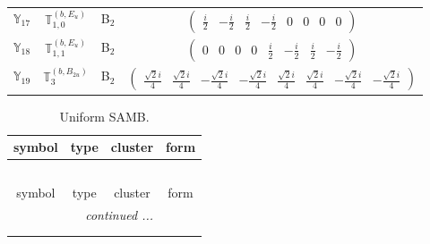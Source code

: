 \documentclass[fleqn,10pt,landscape]{article}
\begin{document}
\begin{itemize}
\begin{center}
\begin{longtable}{c|c|c|c}
$ \mathbb{Y}_{17} $ & $\mathbb{T}_{1,0}^{(b,E_{u})}$ & B$_{2}$ & $\begin{pmatrix} \frac{i}{2} & - \frac{i}{2} & \frac{i}{2} & - \frac{i}{2} & 0 & 0 & 0 & 0 \end{pmatrix}$ \\
$ \mathbb{Y}_{18} $ & $\mathbb{T}_{1,1}^{(b,E_{u})}$ & B$_{2}$ & $\begin{pmatrix} 0 & 0 & 0 & 0 & \frac{i}{2} & - \frac{i}{2} & \frac{i}{2} & - \frac{i}{2} \end{pmatrix}$ \\
$ \mathbb{Y}_{19} $ & $\mathbb{T}_{3}^{(b,B_{2u})}$ & B$_{2}$ & $\begin{pmatrix} \frac{\sqrt{2} i}{4} & \frac{\sqrt{2} i}{4} & - \frac{\sqrt{2} i}{4} & - \frac{\sqrt{2} i}{4} & \frac{\sqrt{2} i}{4} & \frac{\sqrt{2} i}{4} & - \frac{\sqrt{2} i}{4} & - \frac{\sqrt{2} i}{4} \end{pmatrix}$ \\
\end{longtable}
\end{center}
\begin{center}
\renewcommand{\arraystretch}{1.3}
\begin{longtable}{c|c|c|c}
\caption{Uniform SAMB.}
 \\
 \hline \hline
symbol & type & cluster & form \\ \hline \endfirsthead

\multicolumn{3}{l}{\tablename\ \thetable{}} \\
 \hline \hline
symbol & type & cluster & form \\ \hline \endhead

 \hline \hline
\multicolumn{3}{r}{\footnotesize\it continued ...} \\ \endfoot

 \hline \hline
\multicolumn{3}{r}{} \\ \endlastfoot


\end{longtable}
\end{center}
\end{itemize}
\end{document}
